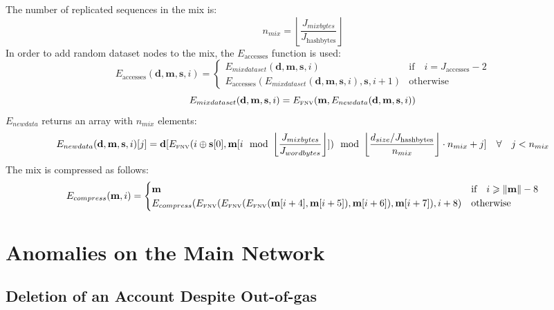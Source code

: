 \documentclass[9pt,oneside]{amsart}
\begin{document}
The number of replicated sequences in the mix is:
\begin{equation}
 n_{mix} =  \left\lfloor\frac{J_{mixbytes}}{J_{\mathrm{hashbytes}}}\right\rfloor
\end{equation}
In order to add random dataset nodes to the mix, the $E_{\mathrm{accesses}}$ function is used:
\begin{equation}
 E_{\mathrm{accesses}}(\mathbf{d}, \mathbf{m}, \mathbf{s}, i) = \begin{cases}
E_{mixdataset}(\mathbf{d}, \mathbf{m},  \mathbf{s}, i) & \text{if} \quad i = J_{\mathrm{accesses}} -2 \\
E_{\mathrm{accesses}}(E_{mixdataset}(\mathbf{d}, \mathbf{m}, \mathbf{s}, i), \mathbf{s}, i + 1) & \text{otherwise}
\end{cases}
\end{equation}
\begin{equation}
 E_{mixdataset}(\mathbf{d}, \mathbf{m}, \mathbf{s}, i) = E_\text{\tiny FNV}(\mathbf{m}, E_{newdata}(\mathbf{d}, \mathbf{m}, \mathbf{s}, i))
\end{equation}
$E_{newdata}$ returns an array with $n_{mix}$ elements:
\begin{equation}
 E_{newdata}(\mathbf{d}, \mathbf{m}, \mathbf{s}, i)[j] = \mathbf{d}[E_\text{\tiny FNV}(i \oplus \mathbf{s}[0], \mathbf{m}[i \mod \left\lfloor\frac{J_{mixbytes}}{J_{wordbytes}}\right\rfloor]) \mod \left\lfloor\frac{d_{size} / J_{\mathrm{hashbytes}}}{n_{mix}}\right\rfloor \cdot n_{mix} + j] \quad \forall \quad j < n_{mix}
\end{equation}
The mix is compressed as follows:
\begin{equation}
 E_{compress}(\mathbf{m}, i) = \begin{cases}
\mathbf{m} & \text{if} \quad i \geqslant \lVert \mathbf{m} \rVert - 8 \\
E_{compress}(E_\text{\tiny FNV}(E_\text{\tiny FNV}(E_\text{\tiny FNV}(\mathbf{m}[i + 4], \mathbf{m}[i + 5]), \mathbf{m}[i + 6]), \mathbf{m}[i + 7]), i + 8) & \text{otherwise}
\end{cases}
\end{equation}

\section{Anomalies on the Main Network}

\subsection{Deletion of an Account Despite Out-of-gas}
\end{document}
